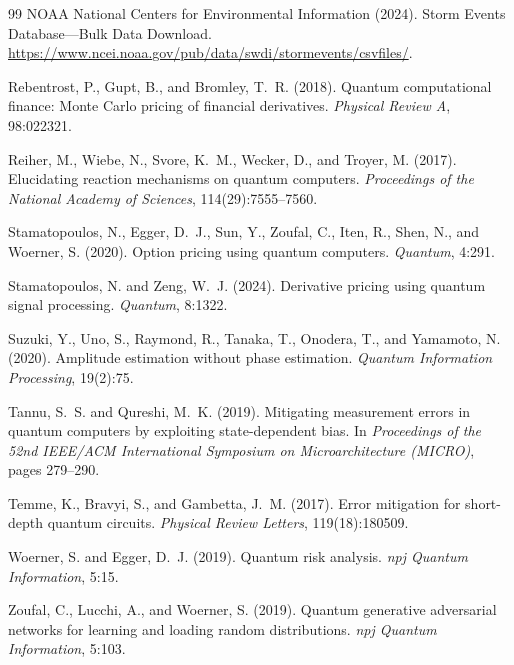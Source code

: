 \documentclass[11pt,a4paper]{article}
\begin{document}
\begin{thebibliography}{99}
{NOAA National Centers for Environmental Information} (2024).
Storm Events Database---Bulk Data Download.
\url{https://www.ncei.noaa.gov/pub/data/swdi/stormevents/csvfiles/}.

Rebentrost, P., Gupt, B., and Bromley, T.~R. (2018).
Quantum computational finance: {Monte Carlo} pricing of financial derivatives.
\emph{Physical Review A}, 98:022321.

Reiher, M., Wiebe, N., Svore, K.~M., Wecker, D., and Troyer, M. (2017).
Elucidating reaction mechanisms on quantum computers.
\emph{Proceedings of the National Academy of Sciences}, 114(29):7555--7560.

Stamatopoulos, N., Egger, D.~J., Sun, Y., Zoufal, C., Iten, R., Shen, N., and Woerner, S. (2020).
Option pricing using quantum computers.
\emph{Quantum}, 4:291.

Stamatopoulos, N. and Zeng, W.~J. (2024).
Derivative pricing using quantum signal processing.
\emph{Quantum}, 8:1322.

Suzuki, Y., Uno, S., Raymond, R., Tanaka, T., Onodera, T., and Yamamoto, N. (2020).
Amplitude estimation without phase estimation.
\emph{Quantum Information Processing}, 19(2):75.

Tannu, S.~S. and Qureshi, M.~K. (2019).
Mitigating measurement errors in quantum computers by exploiting state-dependent bias.
In \emph{Proceedings of the 52nd IEEE/ACM International Symposium on Microarchitecture (MICRO)}, pages 279--290.

Temme, K., Bravyi, S., and Gambetta, J.~M. (2017).
Error mitigation for short-depth quantum circuits.
\emph{Physical Review Letters}, 119(18):180509.

Woerner, S. and Egger, D.~J. (2019).
Quantum risk analysis.
\emph{npj Quantum Information}, 5:15.

Zoufal, C., Lucchi, A., and Woerner, S. (2019).
Quantum generative adversarial networks for learning and loading random distributions.
\emph{npj Quantum Information}, 5:103.

\end{thebibliography}
\end{document}
